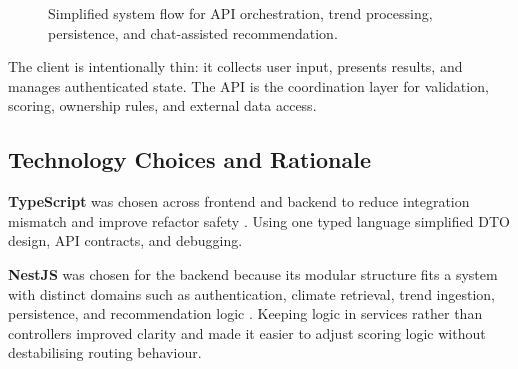 \documentclass[11pt,a4paper]{article}
\begin{document}
\begin{figure}[H]
\centering
{}
\caption{Simplified system flow for API orchestration, trend processing, persistence, and chat-assisted recommendation.}
\label{fig:architecture}
\end{figure}

The client is intentionally thin: it collects user input, presents results, and manages authenticated state. The API is the coordination layer for validation, scoring, ownership rules, and external data access.

\subsection{Technology Choices and Rationale}
\textbf{TypeScript} was chosen across frontend and backend to reduce integration mismatch and improve refactor safety \cite{typescript}. Using one typed language simplified DTO design, API contracts, and debugging.

\textbf{NestJS} was chosen for the backend because its modular structure fits a system with distinct domains such as authentication, climate retrieval, trend ingestion, persistence, and recommendation logic \cite{nestjs}. Keeping logic in services rather than controllers improved clarity and made it easier to adjust scoring logic without destabilising routing behaviour.
\end{document}
